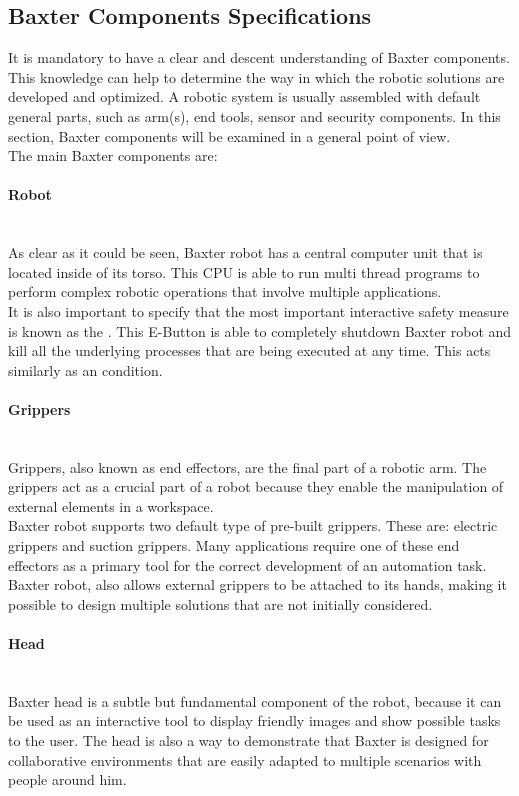 \documentclass[11pt]{report} %
\newcommand{\subsubsubsection}[1]{\paragraph{#1}\mbox{}\\}
\begin{document}
\subsection{Baxter Components Specifications}

It is mandatory to have a clear and descent understanding of Baxter components. This knowledge can help to determine the way in which the robotic solutions are developed and optimized. A robotic system is usually assembled with default general parts, such as arm(s), end tools, sensor and security components. In this section, Baxter components will be examined in a general point of view.\\

The main Baxter components are:

\subsubsubsection{Robot}

As clear as it could be seen, Baxter robot has a central computer unit that is located inside of its torso. This
CPU is able to run multi thread programs to perform complex robotic operations that involve multiple applications.\\

It is also important to specify that the most important interactive safety measure is known as the . This E-Button is able to completely shutdown Baxter robot and kill all the underlying processes that are being executed at any time. This acts similarly as an  condition.\\


\subsubsubsection{Grippers}

Grippers, also known as end effectors, are the final part of a robotic arm. The grippers act as a crucial part of a robot because they enable the manipulation of external elements in a workspace.\\

Baxter robot supports two default type of pre-built grippers. These are: electric grippers and suction grippers. Many applications require one of these end effectors as a primary tool for the correct development of an automation task.\\

Baxter robot, also allows external  grippers to be attached to its hands, making it possible to design multiple solutions that are not initially considered.\\

\subsubsubsection{Head}

Baxter head is a subtle but fundamental component of the robot, because it can be used as an interactive tool to display friendly images and show possible tasks to the user. The head is also a way to demonstrate that Baxter is designed for collaborative environments that are easily adapted to multiple scenarios with people around him.\\ 
\end{document}
